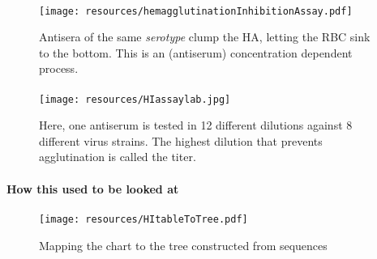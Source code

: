 \documentclass{beamer}
\begin{document}
\begin{darkframes}
    \begin{frame}{\subsecname}
      \framesubtitle{}
      \begin{figure}
        \texttt{[image: resources/hemagglutinationInhibitionAssay.pdf]}
        \caption{Antisera of the same \textit{serotype} clump the HA, letting the RBC sink to the bottom. This is an (antiserum) concentration dependent process.}
      \end{figure}
    \end{frame}

    \begin{frame}{\subsecname}
      \framesubtitle{}
      \begin{figure}
        \texttt{[image: resources/HIassaylab.jpg]}
        \caption{\footnotesize Here, one antiserum is tested in 12 different dilutions against 8 different virus strains. The highest dilution that prevents agglutination is called the titer.}
      \end{figure}
    \end{frame}

    \begin{frame}{\subsecname}
      \framesubtitle{How this used to be looked at}
    \end{frame}

    \begin{frame}{\subsecname}
      \framesubtitle{}
      \begin{figure}
        \texttt{[image: resources/HItableToTree.pdf]}
        \caption{\footnotesize Mapping the chart to the tree constructed from sequences}
      \end{figure}
    \end{frame}


\end{darkframes}
\end{document}
